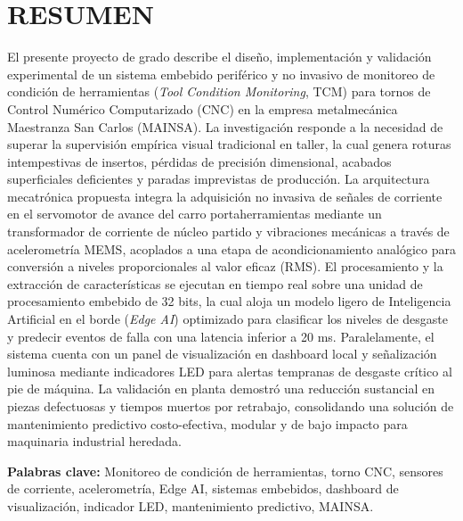 \newpage

%
%

\section*{RESUMEN}

El presente proyecto de grado describe el diseño, implementación y validación experimental de un sistema embebido periférico y no invasivo de monitoreo de condición de herramientas (\textit{Tool Condition Monitoring}, TCM) para tornos de Control Numérico Computarizado (CNC) en la empresa metalmecánica Maestranza San Carlos (MAINSA). La investigación responde a la necesidad de superar la supervisión empírica visual tradicional en taller, la cual genera roturas intempestivas de insertos, pérdidas de precisión dimensional, acabados superficiales deficientes y paradas imprevistas de producción. La arquitectura mecatrónica propuesta integra la adquisición no invasiva de señales de corriente en el servomotor de avance del carro portaherramientas mediante un transformador de corriente de núcleo partido y vibraciones mecánicas a través de acelerometría MEMS, acoplados a una etapa de acondicionamiento analógico para conversión a niveles proporcionales al valor eficaz (RMS). El procesamiento y la extracción de características se ejecutan en tiempo real sobre una unidad de procesamiento embebido de 32 bits, la cual aloja un modelo ligero de Inteligencia Artificial en el borde (\textit{Edge AI}) optimizado para clasificar los niveles de desgaste y predecir eventos de falla con una latencia inferior a 20 ms. Paralelamente, el sistema cuenta con un panel de visualización en dashboard local y señalización luminosa mediante indicadores LED para alertas tempranas de desgaste crítico al pie de máquina. La validación en planta demostró una reducción sustancial en piezas defectuosas y tiempos muertos por retrabajo, consolidando una solución de mantenimiento predictivo costo-efectiva, modular y de bajo impacto para maquinaria industrial heredada.

\textbf{Palabras clave:} Monitoreo de condición de herramientas, torno CNC, sensores de corriente, acelerometría, Edge AI, sistemas embebidos, dashboard de visualización, indicador LED, mantenimiento predictivo, MAINSA.

\newpage

%
%

